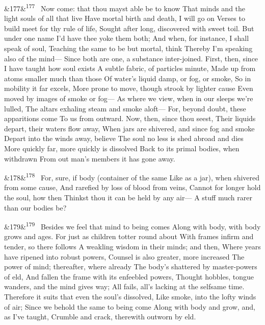 \documentclass[12pt]{article}
\newcommand{\para}[1][]{\par\noindent\ifx&#1&\else\textsuperscript{\footnotesize #1}~\fi}
\begin{document}
\para[177] Now come: that thou mayst able be to know That minds and the light souls of all that live Have mortal birth and death, I will go on Verses to build meet for thy rule of life, Sought after long, discovered with sweet toil. But under one name I'd have thee yoke them both; And when, for instance, I shall speak of soul, Teaching the same to be but mortal, think Thereby I'm speaking also of the mind--- Since both are one, a substance inter-joined. First, then, since I have taught how soul exists A subtle fabric, of particles minute, Made up from atoms smaller much than those Of water's liquid damp, or fog, or smoke, So in mobility it far excels, More prone to move, though strook by lighter cause Even moved by images of smoke or fog--- As where we view, when in our sleeps we're lulled, The altars exhaling steam and smoke aloft--- For, beyond doubt, these apparitions come To us from outward. Now, then, since thou seest, Their liquids depart, their waters flow away, When jars are shivered, and since fog and smoke Depart into the winds away, believe The soul no less is shed abroad and dies More quickly far, more quickly is dissolved Back to its primal bodies, when withdrawn From out man's members it has gone away.

\para[178] For, sure, if body (container of the same Like as a jar), when shivered from some cause, And rarefied by loss of blood from veins, Cannot for longer hold the soul, how then Thinkst thou it can be held by any air--- A stuff much rarer than our bodies be?

\para[179] Besides we feel that mind to being comes Along with body, with body grows and ages. For just as children totter round about With frames infirm and tender, so there follows A weakling wisdom in their minds; and then, Where years have ripened into robust powers, Counsel is also greater, more increased The power of mind; thereafter, where already The body's shattered by master-powers of eld, And fallen the frame with its enfeebled powers, Thought hobbles, tongue wanders, and the mind gives way; All fails, all's lacking at the selfsame time. Therefore it suits that even the soul's dissolved, Like smoke, into the lofty winds of air; Since we behold the same to being come Along with body and grow, and, as I've taught, Crumble and crack, therewith outworn by eld.
\end{document}
